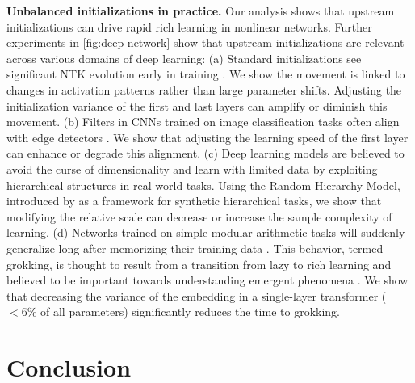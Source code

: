 \documentclass{article}
\theoremstyle{plain}
\theoremstyle{definition}
\theoremstyle{remark}
\begin{document}
\textbf{Unbalanced initializations in practice.}
%
Our analysis shows that upstream initializations can drive rapid rich learning in nonlinear networks. 
% 
Further experiments in \cref{fig:deep-network} show that upstream initializations are relevant across various domains of deep learning:
%
(a) Standard initializations see significant NTK evolution early in training \cite{fort2020deep}. 
%
We show the movement is linked to changes in activation patterns rather than large parameter shifts. 
%
Adjusting the initialization variance of the first and last layers can amplify or diminish this movement.
%
(b) Filters in CNNs trained on image classification tasks often align with edge detectors \cite{krizhevsky2017imagenet}. 
%
We show that adjusting the learning speed of the first layer can enhance or degrade this alignment.
%
(c) Deep learning models are believed to avoid the curse of dimensionality and learn with limited data by exploiting hierarchical structures in real-world tasks.
%
Using the Random Hierarchy Model, introduced by \citet{petrini2023deep} as a framework for synthetic hierarchical tasks, we show that modifying the relative scale can decrease or increase the sample complexity of learning.
%
(d) Networks trained on simple modular arithmetic tasks will suddenly generalize long after memorizing their training data \cite{power2022grokking}. 
%
This behavior, termed grokking, is thought to result from a transition from lazy to rich learning \cite{kumar2023grokking, lyu2023dichotomy, rubin2024grokking} and believed to be important towards understanding emergent phenomena \cite{nanda2023progress}. 
%
We show that decreasing the variance of the embedding in a single-layer transformer ($<6\%$ of all parameters) significantly reduces the time to grokking.
%




\vspace{-10pt}
\section{Conclusion}
\label{sec:conclusion}
\vspace{-10pt}
\end{document}

